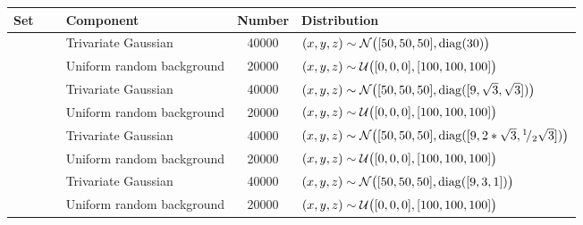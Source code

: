 

\begin{tabular}{@{}cclS[table-format=+1.1e+1,scientific-notation=true,round-mode=places,round-precision=1]l@{}}
\toprule
Set 			&~						& Component					& {Number} 	& Distribution\\
\midrule
\ferdosiOne 	&\legendComponentOne	& Trivariate Gaussian 		& 40000		& $(x, y, z) \sim \mathcal{N}\big([50, 50, 50], \operatorname{diag}(30)\big)$\\
~ 				&\legendComponentNoise	& Uniform random background	& 20000		& $(x, y, z) \sim \mathcal{U}\big([0, 0, 0], [100, 100, 100]\big)$\\
\hline
\baakmanOne		&\legendComponentOne	& Trivariate Gaussian 		& 40000		& $(x, y, z) \sim \mathcal{N}\big([50, 50, 50], \operatorname{diag}([9, \sqrt{3}, \sqrt{3}])\big)$\\
~ 				&\legendComponentNoise	& Uniform random background	& 20000		& $(x, y, z) \sim \mathcal{U}\big([0, 0, 0], [100, 100, 100]\big)$\\
\hline
\baakmanFour	&\legendComponentOne	& Trivariate Gaussian 		& 40000		& $(x, y, z) \sim \mathcal{N}\big([50, 50, 50], \operatorname{diag}([9, 2 * \sqrt{3}, {}^{1}\!/_{2} \sqrt{3}])\big)$\\
~ 				&\legendComponentNoise	& Uniform random background	& 20000		& $(x, y, z) \sim \mathcal{U}\big([0, 0, 0], [100, 100, 100]\big)$\\
\hline
\baakmanFive	&\legendComponentOne	& Trivariate Gaussian 		& 40000		& $(x, y, z) \sim \mathcal{N}\big([50, 50, 50], \operatorname{diag}([9, 3, 1])\big)$\\
~ 				&\legendComponentNoise	& Uniform random background	& 20000		& $(x, y, z) \sim \mathcal{U}\big([0, 0, 0], [100, 100, 100]\big)$\\
\bottomrule
\end{tabular}